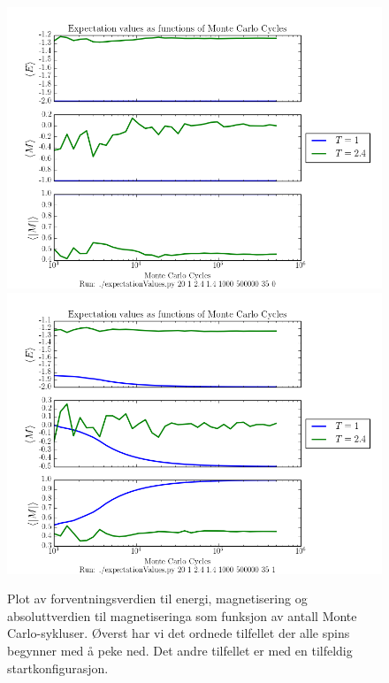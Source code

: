 \documentclass[11pt]{article}
\begin{document}
\begin{figure}[ht]

  \centering
  \includegraphics[scale=0.7]{../fig/E_M_Mabs.png}
  \includegraphics[scale=0.7]{../fig/E_M_Mabs_random.png}
  \caption{Plot av forventningsverdien til energi,
    magnetisering og absoluttverdien til magnetiseringa som funksjon av antall Monte Carlo-sykluser. 
    Øverst har vi det ordnede tilfellet der alle spins begynner med å peke ned. Det andre tilfellet er 
    med en tilfeldig startkonfigurasjon.}
\label{fig:forventningsverdi}
\end{figure}
\end{document}
